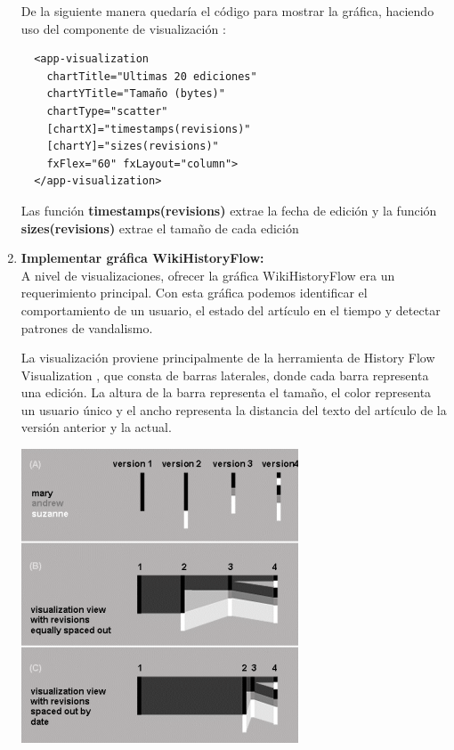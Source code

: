 \begin{enumerate}
  De la siguiente manera quedaría el código para mostrar la gráfica, haciendo uso del componente de visualización :
  \begin{verbatim}
  <app-visualization
    chartTitle="Ultimas 20 ediciones"
    chartYTitle="Tamaño (bytes)"
    chartType="scatter"
    [chartX]="timestamps(revisions)"
    [chartY]="sizes(revisions)" 
    fxFlex="60" fxLayout="column">
  </app-visualization>
  \end{verbatim}
  
  Las función \textbf{timestamps(revisions)} extrae la fecha de edición y la función \textbf{sizes(revisions)} extrae el tamaño de cada edición
  
  
  \item\textbf{Implementar gráfica WikiHistoryFlow:}\\

  A nivel de visualizaciones, ofrecer la gráfica WikiHistoryFlow era un requerimiento principal. Con esta gráfica podemos identificar el comportamiento de un usuario, el estado del artículo en el tiempo y detectar patrones de vandalismo.
  
  La visualización proviene principalmente de la herramienta de History Flow Visualization \cite{HistoryFlow}, que consta de barras laterales, donde cada barra representa una edición. La altura de la barra representa el tamaño, el color representa un usuario único y el ancho representa la distancia del texto del artículo de la versión anterior y la actual.
  
  \begin{center}
      \bigbreak
      \includegraphics{images/marco_aplicativo/history_flow1.png}
      \label{fig:history_flow}
      \bigbreak
  \end{center}
  

\end{enumerate}
